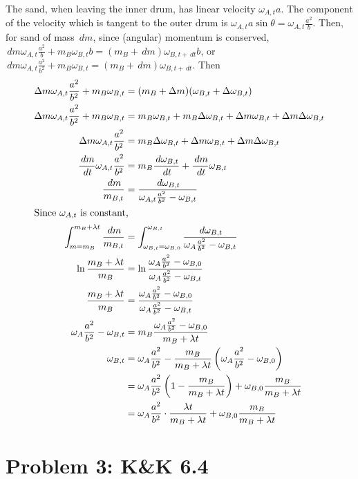 \documentclass[solutions]{esg8012pset}
\renewcommand{\d}{\,d}
\begin{document}
  The sand, when leaving the inner drum, has linear velocity $\omega_{A,t}a$.  The component of the velocity which is tangent to the outer drum is $\omega_{A,t}a\sin\theta = \omega_{A,t}\frac{a^2}{b}$.  Then, for sand of mass $\d m$, since (angular) momentum is conserved, $\d m \omega_{A,t}\frac{a^2}{b} + m_B \omega_{B,t} b = (m_B + \d m)\omega_{B,t+\d t}b$, or $\d m \omega_{A,t}\frac{a^2}{b^2} + m_B \omega_{B,t} = (m_B + \d m)\omega_{B,t+\d t}$.  Then \begin{align*}
  \Delta m \omega_{A,t}\frac{a^2}{b^2} + m_B \omega_{B,t} & = (m_B + \Delta m)(\omega_{B,t} + \Delta \omega_{B, t}) \\
  \Delta m \omega_{A,t}\frac{a^2}{b^2} + m_B \omega_{B,t} & = m_B \omega_{B,t} + m_B \Delta \omega_{B, t} + \Delta m \omega_{B,t} + \Delta m \Delta \omega_{B, t} \\
  \Delta m \omega_{A,t}\frac{a^2}{b^2} & = m_B \Delta \omega_{B, t} + \Delta m \omega_{B,t} + \Delta m \Delta \omega_{B, t} \\
  \frac{\d m}{\d t} \omega_{A,t}\frac{a^2}{b^2} & = m_B \frac{\d \omega_{B, t}}{\d t} + \frac{\d m}{\d t} \omega_{B,t} \\
  \frac{\d m}{m_{B, t}} & = \frac{\d \omega_{B, t}}{\omega_{A,t}\frac{a^2}{b^2} - \omega_{B,t}} \\
  \intertext{Since $\omega_{A, t}$ is constant,}
  \int_{m = m_B}^{m_B + \lambda t}\frac{\d m}{m_{B, t}} & = \int_{\omega_{B, t} = \omega_{B, 0}}^{\omega_{B, t}}\frac{\d \omega_{B, t}}{\omega_A\frac{a^2}{b^2} - \omega_{B,t}} \\
  \ln\frac{m_B + \lambda t}{m_B} & = \ln\frac{\omega_A\frac{a^2}{b^2} - \omega_{B,0}}{\omega_A\frac{a^2}{b^2} - \omega_{B,t}} \\
  \frac{m_B + \lambda t}{m_B} & = \frac{\omega_A\frac{a^2}{b^2} - \omega_{B,0}}{\omega_A\frac{a^2}{b^2} - \omega_{B,t}} \\
  \omega_A\frac{a^2}{b^2} - \omega_{B,t} & = m_B\frac{\omega_A\frac{a^2}{b^2} - \omega_{B,0}}{m_B + \lambda t} \\
  \omega_{B,t} & = \omega_A\frac{a^2}{b^2} - \frac{m_B}{m_B + \lambda t}\left(\omega_A\frac{a^2}{b^2} - \omega_{B,0}\right) \\
    & = \omega_A\frac{a^2}{b^2}\left(1 - \frac{m_B}{m_B + \lambda t}\right) + \omega_{B,0}\frac{m_B}{m_B + \lambda t} \\
    & = \omega_A\frac{a^2}{b^2}\cdot \frac{\lambda t}{m_B + \lambda t} + \omega_{B,0}\frac{m_B}{m_B + \lambda t}
  \end{align*}
\section*{Problem 3: K\&K 6.4}
\end{document}
